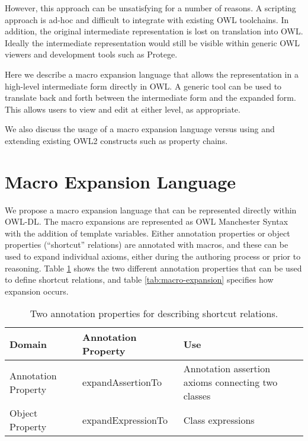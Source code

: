 \documentclass[11pt]{article}
\begin{document}
However, this approach can be unsatisfying for a number of reasons. A
scripting approach is ad-hoc and difficult to integrate with existing
OWL toolchains. In addition, the original intermediate representation
is lost on translation into OWL. Ideally the intermediate
representation would still be visible within generic OWL viewers and
development tools such as Protege.



Here we describe a macro expansion language that allows the
representation in a high-level intermediate form directly in OWL. A
generic tool can be used to translate back and forth between the
intermediate form and the expanded form. This allows users to view and
edit at either level, as appropriate.


We also discuss the usage of a macro expansion language versus using
and extending existing OWL2 constructs such as property chains.

\section{Macro Expansion Language}

We propose a macro expansion language that can be represented directly
within OWL-DL. The macro expansions are represented as OWL Manchester
Syntax\cite{Horridge2006} with the addition of template
variables. Either annotation properties or object properties
(``shortcut'' relations) are annotated with macros, and these can be
used to expand individual axioms, either during the authoring process
or prior to reasoning. Table \ref{tab:macro-defining-props} shows the
two different annotation properties that can be used to define
shortcut relations, and table \ref{tab:macro-expansion} specifies how
expansion occurs.

  \begin{table}
    \begin{tabular}{ | p{3.5cm} | p{3.5cm} | p{5cm} | }
      \hline 
      \textbf{Domain} & \textbf{Annotation Property} & \textbf{Use} \\

      \hline
      Annotation Property & expandAssertionTo & Annotation assertion axioms connecting two classes \\

      \hline
      Object Property & expandExpressionTo & Class expressions \\

      \hline
    \end{tabular}
    \caption{Two annotation properties for describing shortcut relations.}
    \label{tab:macro-defining-props}
  \end{table}
\end{document}
